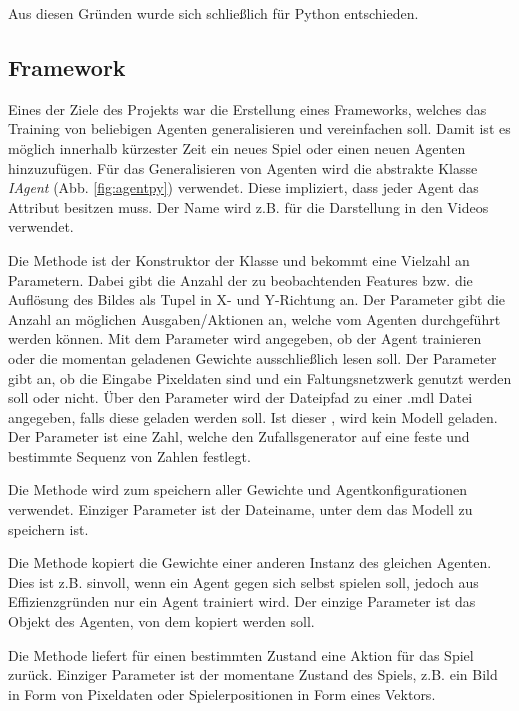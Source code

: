 \documentclass[12pt,a4paper]{article}
\begin{document}
Aus diesen Gründen wurde sich schließlich für Python entschieden.

\subsection{Framework}
Eines der Ziele des Projekts war die Erstellung eines Frameworks, welches das Training von beliebigen Agenten generalisieren und vereinfachen soll.
Damit ist es möglich innerhalb kürzester Zeit ein neues Spiel oder einen neuen Agenten hinzuzufügen.
Für das Generalisieren von Agenten wird die abstrakte Klasse \textit{IAgent} (Abb. \ref{fig:agentpy}) verwendet.
Diese impliziert, dass jeder Agent das Attribut  besitzen muss.
Der Name wird z.B. für die Darstellung in den Videos verwendet.

Die Methode  ist der Konstruktor der Klasse und bekommt eine Vielzahl an Parametern.
Dabei gibt  die Anzahl der zu beobachtenden Features bzw. die Auflösung des Bildes als Tupel in X- und Y-Richtung an.
Der Parameter  gibt die Anzahl an möglichen Ausgaben/Aktionen an, welche vom Agenten durchgeführt werden können.
Mit dem Parameter  wird angegeben, ob der Agent trainieren oder die momentan geladenen Gewichte ausschließlich lesen soll.
Der Parameter  gibt an, ob die Eingabe Pixeldaten sind und ein Faltungsnetzwerk genutzt werden soll oder nicht.
Über den Parameter  wird der Dateipfad zu einer .mdl Datei angegeben, falls diese geladen werden soll.
Ist dieser , wird kein Modell geladen.
Der Parameter  ist eine Zahl, welche den Zufallsgenerator auf eine feste und bestimmte Sequenz von Zahlen festlegt.

Die Methode  wird zum speichern aller Gewichte und Agentkonfigurationen verwendet.
Einziger Parameter ist der Dateiname, unter dem das Modell zu speichern ist.

Die Methode  kopiert die Gewichte einer anderen Instanz des gleichen Agenten.
Dies ist z.B. sinvoll, wenn ein Agent gegen sich selbst spielen soll, jedoch aus Effizienzgründen nur ein Agent trainiert wird.
Der einzige Parameter ist das Objekt des Agenten, von dem kopiert werden soll.

Die Methode  liefert für einen bestimmten Zustand eine Aktion für das Spiel zurück.
Einziger Parameter ist der momentane Zustand des Spiels, z.B. ein Bild in Form von Pixeldaten oder Spielerpositionen in Form eines Vektors.
\end{document}
